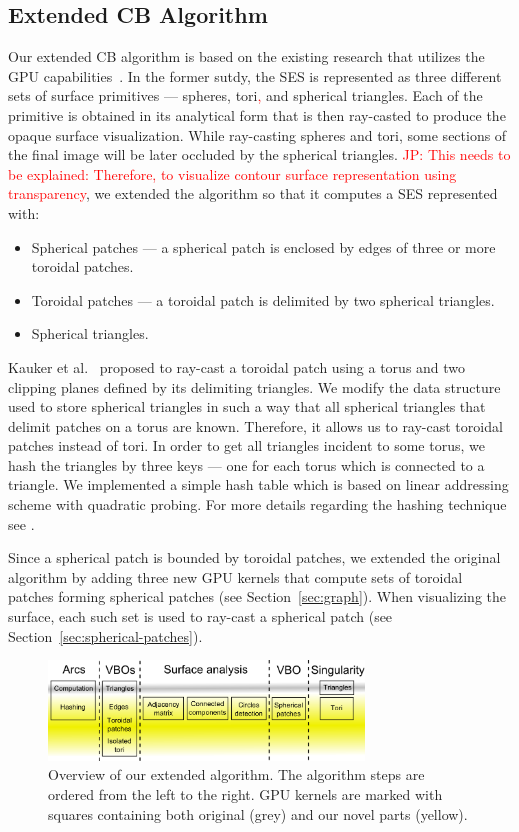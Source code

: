 \subsection{Extended CB Algorithm}

Our extended CB algorithm is based on the existing research that utilizes the GPU capabilities~\cite{krone2011parallel}.
In the former sutdy, the SES is represented as three different sets of surface primitives --- spheres, tori\textcolor{red}{,} and spherical triangles. Each of the primitive is obtained in its analytical form that is then ray-casted to produce the opaque surface visualization.
While ray-casting spheres and tori, some sections of the final image will be later occluded by the spherical triangles.
\textcolor{red}{JP: This needs to be explained: Therefore, to visualize contour surface representation using transparency}, we extended the algorithm so that it computes a SES represented with:
\begin{itemize}
  \item Spherical patches --- a spherical patch is enclosed by edges of three or more toroidal patches.
	\item Toroidal patches --- a toroidal patch is delimited by two spherical triangles.
	\item Spherical triangles.
\end{itemize}

Kauker et al.~\cite{kauker2013rendering} proposed to ray-cast a toroidal patch using a torus and two clipping planes defined by its delimiting triangles.
We modify the data structure used to store spherical triangles in such a way that all spherical triangles that delimit patches on a torus are known. Therefore, it allows us to ray-cast toroidal patches instead of tori.
In order to get all triangles incident to some torus, we hash the triangles by three keys --- one for each torus which is connected to a triangle.
We implemented a simple hash table which is based on linear addressing scheme with quadratic probing.
For more details regarding the hashing technique see \cite{alcantara2011efficient}.

Since a spherical patch is bounded by toroidal patches, we extended the original algorithm by adding three new GPU kernels that compute sets of toroidal patches forming spherical patches (see Section~\ref{sec:graph}).
When visualizing the surface, each such set is used to ray-cast a spherical patch (see Section~\ref{sec:spherical-patches}).

\begin{figure}[htb]
  \centering
  \includegraphics[width=3.3in]{image/kernels.png}
  \caption{Overview of our extended algorithm.
	The algorithm steps are ordered from the left to the right.
	GPU kernels are marked with squares containing both original (grey) and our novel parts (yellow).}
	\label{fig:kernels}
\end{figure}


